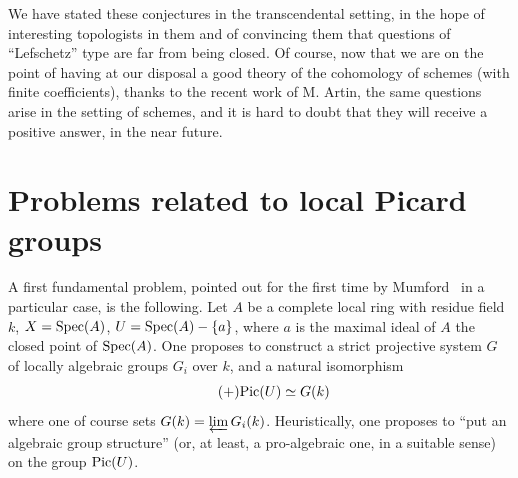 We have stated these conjectures in the transcendental setting, in
the hope of interesting topologists in them and of convincing them that
questions of ``Lefschetz'' type are far from being closed.
Of course, now that we are on the point of having at our disposal
a good theory of the cohomology of schemes (with finite
coefficients), thanks to the recent work of M. Artin, the
same questions arise in the setting of schemes, and it is
hard to doubt that they will receive a positive answer,
in the near future.

\section{Problems related to local Picard groups} \label{XIII.5}

A first fundamental problem, pointed out for the first time by Mumford~\cite{XIII.5} in a particular case, is the following. Let $A$ be a complete local ring with residue field $k$, $X=\operatorname{Spec}(A)$, $U=\operatorname{Spec}(A)-\{a\}$, where $a$ is the maximal ideal of $A$ \ie the closed point of $\operatorname{Spec}(A)$. One proposes to construct a strict projective system $G$ of locally algebraic groups $G_i$ over $k$, and a natural isomorphism \begin{equation*} \label{eq:XIII.5.+} \tag{$+$} {\operatorname{Pic}(U)\simeq G(k)} \end{equation*} where one of course sets $G(k)=\varprojlim G_i(k)$. Heuristically, one proposes to ``put an algebraic group structure'' (or, at least, a pro-algebraic one, in a suitable sense) on the group $\operatorname{Pic}(U)$.


